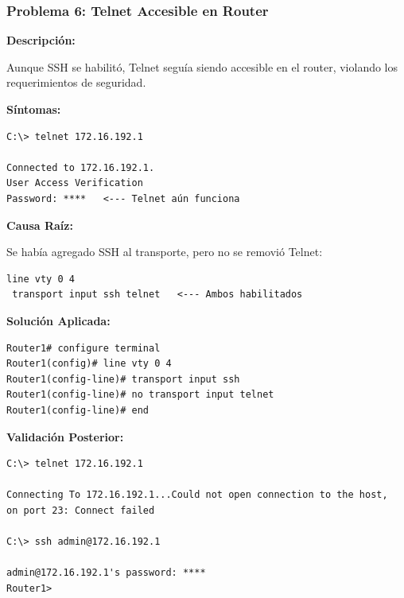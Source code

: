 \subsubsection{Problema 6: Telnet Accesible en Router}

\textbf{Descripción:}

Aunque SSH se habilitó, Telnet seguía siendo accesible en el router,
violando los requerimientos de seguridad.

\textbf{Síntomas:}

\begin{verbatim}
C:\> telnet 172.16.192.1

Connected to 172.16.192.1.
User Access Verification
Password: ****   <--- Telnet aún funciona
\end{verbatim}

\textbf{Causa Raíz:}

Se había agregado SSH al transporte, pero no se removió Telnet:

\begin{verbatim}
line vty 0 4
 transport input ssh telnet   <--- Ambos habilitados
\end{verbatim}

\textbf{Solución Aplicada:}

\begin{verbatim}
Router1# configure terminal
Router1(config)# line vty 0 4
Router1(config-line)# transport input ssh
Router1(config-line)# no transport input telnet
Router1(config-line)# end
\end{verbatim}

\textbf{Validación Posterior:}

\begin{verbatim}
C:\> telnet 172.16.192.1

Connecting To 172.16.192.1...Could not open connection to the host,
on port 23: Connect failed

C:\> ssh admin@172.16.192.1

admin@172.16.192.1's password: ****
Router1>
\end{verbatim}

